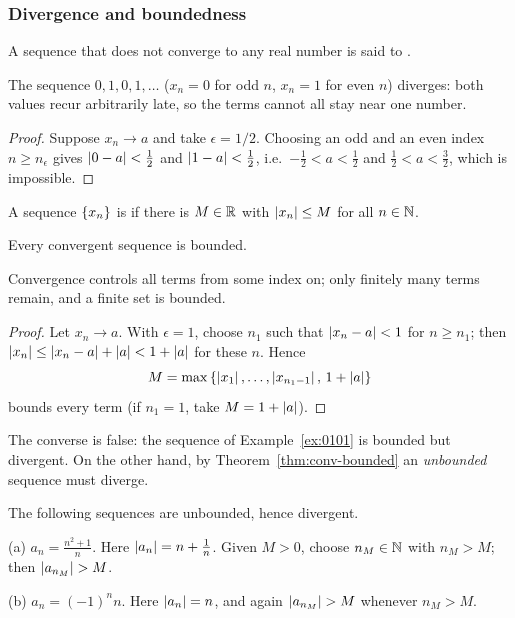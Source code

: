 \subsubsection{Divergence and boundedness}
A sequence that does not converge to any real number is said to
.

\begin{example}\label{ex:0101}
    The sequence $0,1,0,1,\ldots$ ($x_n=0$ for odd $n$, $x_n=1$ for even $n$)
    diverges: both values recur arbitrarily late, so the terms cannot all
    stay near one number.
\end{example}

\begin{proof}
    Suppose $x_n\to a$ and take $\epsilon=1/2$. Choosing an odd and an even
    index $n\geq n_\epsilon$ gives $\left|0-a\right|<\frac12$ and $\left|1-a\right|<\frac12$,
    i.e.\ $-\frac12<a<\frac12$ and $\frac12<a<\frac32$, which is impossible.
\end{proof}

\begin{definition}
    A sequence $\left\{x_n\right\}$ is  if there is $M\in\mathbb{R}$ with
    $\left|x_n\right|\leq M$ for all $n\in\mathbb{N}$.
\end{definition}

\begin{theorem}\label{thm:conv-bounded}
    Every convergent sequence is bounded.
\end{theorem}

Convergence controls all terms from some index on; only finitely many terms
remain, and a finite set is bounded.

\begin{proof}
    Let $x_n\to a$. With $\epsilon=1$, choose $n_1$ such that
    $\left|x_n-a\right|<1$ for $n\geq n_1$; then
    $\left|x_n\right|\leq\left|x_n-a\right|+\left|a\right|<1+\left|a\right|$ for these $n$. Hence
    \begin{equation*}
        M=\max\left\{\left|x_1\right|,\ldots,\left|x_{n_1-1}\right|,\,1+\left|a\right|\right\}
    \end{equation*}
    bounds every term (if $n_1=1$, take $M=1+\left|a\right|$).
\end{proof}

The converse is false: the sequence of Example~\ref{ex:0101} is bounded but
divergent. On the other hand, by Theorem~\ref{thm:conv-bounded} an
\emph{unbounded} sequence must diverge.

\begin{example}
    The following sequences are unbounded, hence divergent.

    (a) $a_n=\frac{n^2+1}{n}$. Here $\left|a_n\right|=n+\frac1n$. Given $M>0$,
    choose $n_M\in\mathbb{N}$ with $n_M>M$; then $\abs{a_{n_M}}>M$.

    (b) $a_n=(-1)^n n$. Here $\left|a_n\right|=n$, and again $\abs{a_{n_M}}>M$
    whenever $n_M>M$.
\end{example}

